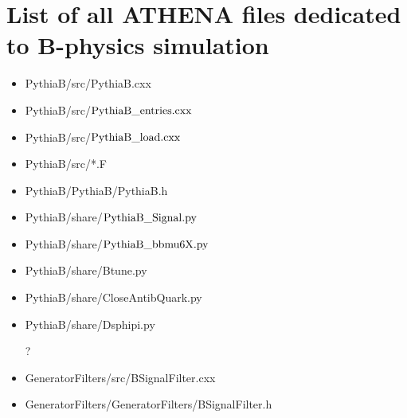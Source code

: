 



\section{List of all ATHENA files  dedicated to B-physics simulation  }
\begin{itemize}
\vspace{-3mm}\item PythiaB/src/PythiaB.cxx \vspace{-3mm}\item
PythiaB/src/$\rm PythiaB\_entries.cxx$
 \vspace{-3mm}\item
PythiaB/src/$\rm PythiaB\_load.cxx$ \vspace{-3mm}\item
PythiaB/src/*.F \vspace{-3mm}\item PythiaB/PythiaB/PythiaB.h

\vspace{-3mm}\item PythiaB/share/$\rm PythiaB\_Signal.py$
\vspace{-3mm}\item PythiaB/share/$\rm PythiaB\_bbmu6X.py$
\vspace{-3mm}\item PythiaB/share/Btune.py \vspace{-3mm}\item
PythiaB/share/CloseAntibQuark.py \vspace{-3mm}\item
PythiaB/share/Dsphipi.py

?


\vspace{12mm} \vspace{-3mm}\item
GeneratorFilters/src/BSignalFilter.cxx \vspace{-3mm}
\item
GeneratorFilters/GeneratorFilters/BSignalFilter.h

\end{itemize}

